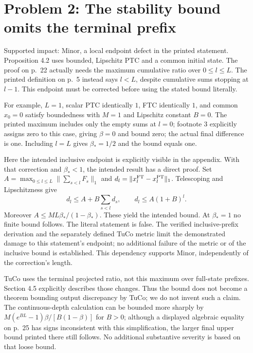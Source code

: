 \documentclass[10pt]{article}
\begin{document}
\section*{Problem 2: The stability bound omits the terminal prefix}
Supported impact: Minor, a local endpoint defect in the printed statement. Proposition 4.2 uses bounded, Lipschitz PTC and a common initial state. The proof on p. 22 actually needs the maximum cumulative ratio over \(0\le l\le L\). The printed definition on p. 5 instead says \(l<L\), despite cumulative sums stopping at \(l-1\). This endpoint must be corrected before using the stated bound literally.\par
For example, \(L=1\), scalar PTC identically \(1\), FTC identically \(1\), and common \(x_0=0\) satisfy boundedness with \(M=1\) and Lipschitz constant \(B=0\). The printed maximum includes only the empty sums at \(l=0\); footnote 3 explicitly assigns zero to this case, giving \(\beta=0\) and bound zero; the actual final difference is one. Including \(l=L\) gives \(\beta_*=1/2\) and the bound equals one.\par
Here the intended inclusive endpoint is explicitly visible in the appendix. With that correction and \(\beta_*<1\), the intended result has a direct proof. Set \(A=\max_{0\le l\le L}\|\sum_{s<l}F_s\|_1\) and \(d_l=\|x_l^{\rm FT}-x_l^{\rm PT}\|_1\). Telescoping and Lipschitzness give \[d_l\le A+B\sum_{s<l}d_s,\qquad d_l\le A(1+B)^l.\] Moreover \(A\le ML\beta_* /(1-\beta_*)\). These yield the intended bound. At \(\beta_*=1\) no finite bound follows. The literal statement is false. The verified inclusive-prefix derivation and the separately defined TuCo metric limit the demonstrated damage to this statement’s endpoint; no additional failure of the metric or of the inclusive bound is established. This dependency supports Minor, independently of the correction’s length.\par
TuCo uses the terminal projected ratio, not this maximum over full-state prefixes. Section 4.5 explicitly describes those changes. Thus the bound does not become a theorem bounding output discrepancy by TuCo; we do not invent such a claim. The continuous-depth calculation can be bounded more sharply by \(M(e^{BL}-1)\beta/[B(1-\beta)]\) for \(B>0\); although a displayed algebraic equality on p. 25 has signs inconsistent with this simplification, the larger final upper bound printed there still follows. No additional substantive severity is based on that loose bound.\par
\end{document}
